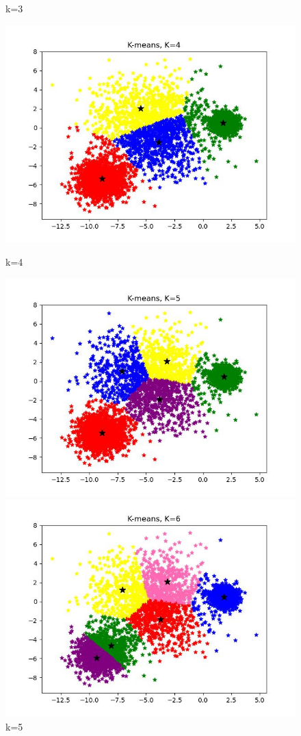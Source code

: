 \documentclass[UTF8]{ctexart}
\begin{document}
\begin{figure}[H]
\begin{minipage}{0.32\linewidth}
		\caption{k=3}
		\label{chutian2}%
	\end{minipage}
  \begin{minipage}{0.32\linewidth}
		\centering
		\includegraphics[width=0.9\linewidth]{k=4.jpg}
		\caption{k=4}
		\label{chutian1}%
	\end{minipage}
	\begin{minipage}{0.32\linewidth}
		\centering
		\includegraphics[width=0.9\linewidth]{k=5.jpg}
		\caption{k=5}
		\label{chutian2}%
	\end{minipage}
  \begin{minipage}{0.32\linewidth}
		\centering
		\includegraphics[width=0.9\linewidth]{k=6.jpg}

\end{minipage}
\end{figure}
\end{document}
